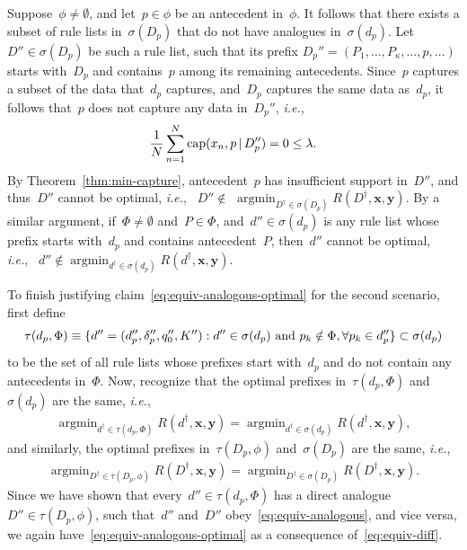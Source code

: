 \documentclass[twoside,11pt]{article}
\def\ie{{\it i.e.},~}
\newcommand{\x}{\mathbf{x}}
\newcommand{\y}{\mathbf{y}}
\def\RL{{d}}
\def\Prefix{d_p}
\def\Labels{\delta_p}
\def\Default{q_0}
\def\RLB{{D}}
\def\PrefixB{D_p}
\def\Obj{R}
\def\Reg{{\lambda}}
\def\Cap{\textnormal{cap}}
\def\StartsWith{\sigma}
\DeclareMathOperator*{\argmin}{argmin}
\newcommand{\nn}{\nonumber}
\newcommand{\given}{\,|\,}
\begin{document}
Suppose~${\phi \neq \emptyset}$, and let~${p \in \phi}$
be an antecedent in~$\phi$.
%
It follows that there exists a subset of rule lists
in~$\StartsWith(\PrefixB)$ that do not have analogues
in~$\StartsWith(\Prefix)$.
%
Let~${\RLB'' \in \StartsWith(\PrefixB)}$ be such a rule list,
such that its prefix ${\PrefixB'' = (P_1, \dots, P_\kappa, \dots, p, \dots)}$
starts with~$\PrefixB$ and contains~$p$ among its remaining antecedents.
%
Since~$p$ captures a subset of the data that~$\Prefix$ captures,
and~$\PrefixB$ captures the same data as~$\Prefix$,
it follows that~$p$ does not capture any data in~$\PrefixB''$, \ie
\begin{align}
\frac{1}{N} \sum_{n=1}^N \Cap(x_n, p \given \PrefixB'') = 0 \le \Reg. \nn
\end{align}
By Theorem~\ref{thm:min-capture}, antecedent~$p$ has insufficient
support in~$\RLB''$, and thus~$\RLB''$ cannot be optimal, \ie
${\RLB'' \notin}$ ${\argmin_{\RLB^\dagger \in \StartsWith(\PrefixB)} \Obj(\RLB^\dagger, \x, \y)}$.
%
By a similar argument, if~${\Phi \neq \emptyset}$
and~${P \in \Phi}$, and~${\RL'' \in \StartsWith(\Prefix)}$
is any rule list whose prefix starts with~$\Prefix$
and contains antecedent~$P$, then~$\RL''$ cannot be optimal, \ie
${\RL'' \notin \argmin_{\RL^\dagger \in \StartsWith(\Prefix)} \Obj(\RL^\dagger, \x, \y)}$.

To finish justifying claim~\eqref{eq:equiv-analogous-optimal}
for the second scenario, first define
\begin{align}
\tau(\Prefix, \Phi) \equiv
  \{\RL'' = (\Prefix'', \Labels'', \Default'', K'') :
    \RL'' \in \StartsWith(\Prefix) \textnormal{ and }
    p_k \notin \Phi, \forall p_k \in \Prefix''\} \subset \StartsWith(\Prefix) \nn
\end{align}
to be the set of all rule lists whose prefixes start with~$\Prefix$
and do not contain any antecedents in~$\Phi$.
%
Now, recognize that the optimal prefixes in~$\tau(\Prefix, \Phi)$
and~$\StartsWith(\Prefix)$ are the same, \ie
\begin{align}
\argmin_{\RL^\dagger \in \tau(\Prefix, \Phi)} \Obj(\RL^\dagger, \x, \y)
= \argmin_{\RL^\dagger \in \StartsWith(\Prefix)} \Obj(\RL^\dagger, \x, \y), \nn
\end{align}
and similarly, the optimal prefixes in~$\tau(\PrefixB, \phi)$
and~$\StartsWith(\PrefixB)$ are the same, \ie
\begin{align}
\argmin_{\RLB^\dagger \in \tau(\PrefixB, \phi)} \Obj(\RLB^\dagger, \x, \y)
= \argmin_{\RLB^\dagger \in \StartsWith(\PrefixB)} \Obj(\RLB^\dagger, \x, \y). \nn
\end{align}
Since we have shown that every~${\RL'' \in \tau(\Prefix, \Phi)}$
has a direct analogue~${\RLB'' \in \tau(\PrefixB, \phi)}$,
such that~$\RL''$ and~$\RLB''$ obey~\eqref{eq:equiv-analogous},
and vice versa, we again have~\eqref{eq:equiv-analogous-optimal}
as a consequence of~\eqref{eq:equiv-diff}.
\end{document}
